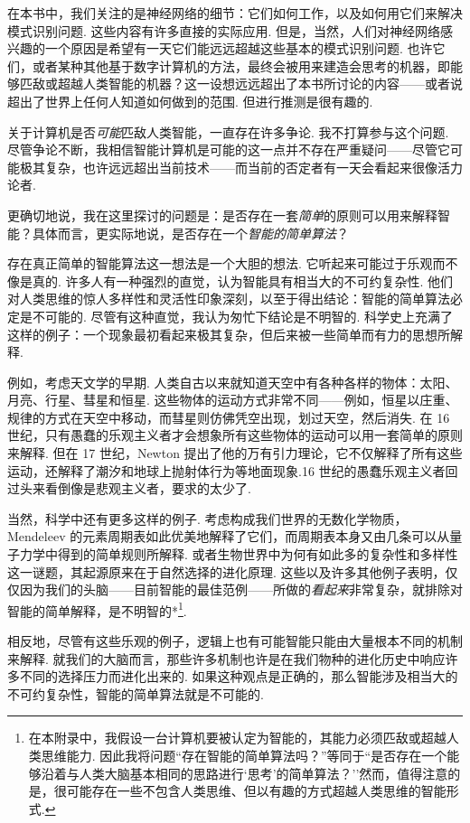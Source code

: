 在本书中，我们关注的是神经网络的细节：它们如何工作，以及如何用它们来解决模式识别问题. 这些内容有许多直接的实际应用. 但是，当然，人们对神经网络感兴趣的一个原因是希望有一天它们能远远超越这些基本的模式识别问题. 也许它们，或者某种其他基于数字计算机的方法，最终会被用来建造会思考的机器，即能够匹敌或超越人类智能的机器？这一设想远远超出了本书所讨论的内容——或者说超出了世界上任何人知道如何做到的范围. 但进行推测是很有趣的.

关于计算机是否\emph{可能}匹敌人类智能，一直存在许多争论. 我不打算参与这个问题. 尽管争论不断，我相信智能计算机是可能的这一点并不存在严重疑问——尽管它可能极其复杂，也许远远超出当前技术——而当前的否定者有一天会看起来很像活力论者.

更确切地说，我在这里探讨的问题是：是否存在一套\emph{简单}的原则可以用来解释智能？具体而言，更实际地说，是否存在一个\emph{智能的简单算法}？

存在真正简单的智能算法这一想法是一个大胆的想法. 它听起来可能过于乐观而不像是真的. 许多人有一种强烈的直觉，认为智能具有相当大的不可约复杂性. 他们对人类思维的惊人多样性和灵活性印象深刻，以至于得出结论：智能的简单算法必定是不可能的. 尽管有这种直觉，我认为匆忙下结论是不明智的. 科学史上充满了这样的例子：一个现象最初看起来极其复杂，但后来被一些简单而有力的思想所解释.

例如，考虑天文学的早期. 人类自古以来就知道天空中有各种各样的物体：太阳、月亮、行星、彗星和恒星. 这些物体的运动方式非常不同——例如，恒星以庄重、规律的方式在天空中移动，而彗星则仿佛凭空出现，划过天空，然后消失. 在 16 世纪，只有愚蠢的乐观主义者才会想象所有这些物体的运动可以用一套简单的原则来解释. 但在 17 世纪，Newton 提出了他的万有引力理论，它不仅解释了所有这些运动，还解释了潮汐和地球上抛射体行为等地面现象.16 世纪的愚蠢乐观主义者回过头来看倒像是悲观主义者，要求的太少了.

当然，科学中还有更多这样的例子. 考虑构成我们世界的无数化学物质，Mendeleev 的元素周期表如此优美地解释了它们，而周期表本身又由几条可以从量子力学中得到的简单规则所解释. 或者生物世界中为何有如此多的复杂性和多样性这一谜题，其起源原来在于自然选择的进化原理. 这些以及许多其他例子表明，仅仅因为我们的头脑——目前智能的最佳范例——所做的\emph{看起来}非常复杂，就排除对智能的简单解释，是不明智的*\footnote{在本附录中，我假设一台计算机要被认定为智能的，其能力必须匹敌或超越人类思维能力. 因此我将问题``存在智能的简单算法吗？''等同于``是否存在一个能够沿着与人类大脑基本相同的思路进行`思考'的简单算法？''然而，值得注意的是，很可能存在一些不包含人类思维、但以有趣的方式超越人类思维的智能形式.}.

相反地，尽管有这些乐观的例子，逻辑上也有可能智能只能由大量根本不同的机制来解释. 就我们的大脑而言，那些许多机制也许是在我们物种的进化历史中响应许多不同的选择压力而进化出来的. 如果这种观点是正确的，那么智能涉及相当大的不可约复杂性，智能的简单算法就是不可能的.

